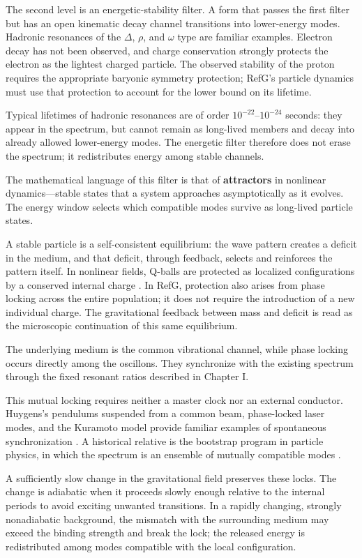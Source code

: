 \documentclass[11pt,a4paper]{article}
\begin{document}
The second level is an energetic-stability filter. A form that passes the first filter but has an open kinematic decay channel transitions into lower-energy modes. Hadronic resonances of the $\Delta$, $\rho$, and $\omega$ type are familiar examples. Electron decay has not been observed, and charge conservation strongly protects the electron as the lightest charged particle. The observed stability of the proton requires the appropriate baryonic symmetry protection; RefG's particle dynamics must use that protection to account for the lower bound on its lifetime.

Typical lifetimes of hadronic resonances are of order $10^{-22}$--$10^{-24}$ seconds: they appear in the spectrum, but cannot remain as long-lived members and decay into already allowed lower-energy modes. The energetic filter therefore does not erase the spectrum; it redistributes energy among stable channels.

The mathematical language of this filter is that of \textbf{attractors} in nonlinear dynamics---stable states that a system approaches asymptotically as it evolves. The energy window selects which compatible modes survive as long-lived particle states.

A stable particle is a self-consistent equilibrium: the wave pattern creates a deficit in the medium, and that deficit, through feedback, selects and reinforces the pattern itself. In nonlinear fields, Q-balls are protected as localized configurations by a conserved internal charge \citep{coleman1985}. In RefG, protection also arises from phase locking across the entire population; it does not require the introduction of a new individual charge. The gravitational feedback between mass and deficit is read as the microscopic continuation of this same equilibrium.

The underlying medium is the common vibrational channel, while phase locking occurs directly among the oscillons. They synchronize with the existing spectrum through the fixed resonant ratios described in Chapter I.

This mutual locking requires neither a master clock nor an external conductor. Huygens's pendulums suspended from a common beam, phase-locked laser modes, and the Kuramoto model provide familiar examples of spontaneous synchronization \citep{huygens1665,kuramoto1975}. A historical relative is the bootstrap program in particle physics, in which the spectrum is an ensemble of mutually compatible modes \citep{chew1961}.

A sufficiently slow change in the gravitational field preserves these locks. The change is adiabatic when it proceeds slowly enough relative to the internal periods to avoid exciting unwanted transitions. In a rapidly changing, strongly nonadiabatic background, the mismatch with the surrounding medium may exceed the binding strength and break the lock; the released energy is redistributed among modes compatible with the local configuration.
\end{document}

